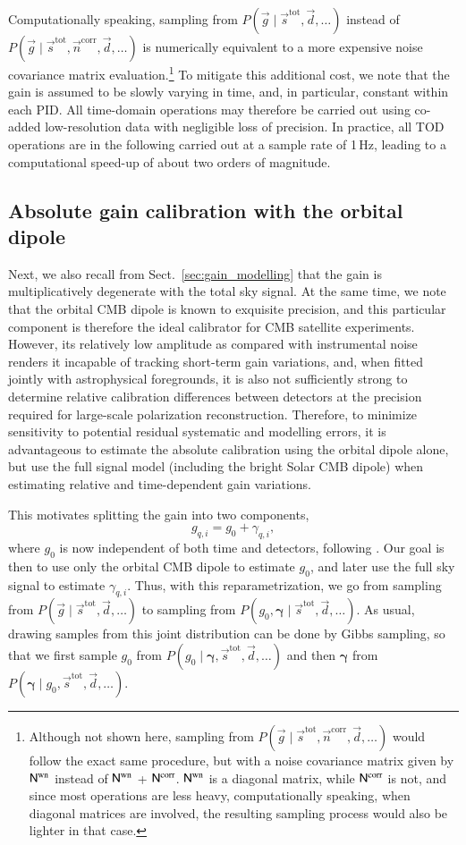 \documentclass[twocolumn]{aa}
\renewcommand{\d}[0]{\vec{d}}
\newcommand{\n}[0]{\vec{n}}
\newcommand{\s}[0]{\vec{s}}
\newcommand{\g}[0]{\vec{g}}
\newcommand{\bgamma}[0]{\boldsymbol{\gamma}}
\newcommand{\N}[0]{\tens{N}}
\newcommand{\qi}[0]{_{q, i}}
\newcommand{\tot}[0]{^{\mathrm{tot}}}
\newcommand{\corr}[0]{^{\mathrm{corr}}}
\newcommand{\wn}[0]{^{\mathrm{wn}}}
\begin{document}
Computationally speaking, sampling from $P(\g\mid\s\tot, \d, \ldots)$ instead of $P(\g\mid\s\tot, \n\corr, \d, \ldots)$ is numerically equivalent to a
more expensive noise covariance matrix evaluation.\footnote{Although not shown here, sampling from $P(\g\mid\s\tot, \n\corr, \d, \ldots)$ would follow the exact same procedure, but with a noise covariance matrix given by $\N\wn$ instead of $\N\wn$ + $\N\corr$. $\N\wn$ is a diagonal matrix, while $\N\corr$ is not, and since most operations are less heavy, computationally speaking, when diagonal matrices are involved, the resulting sampling process would also be lighter in that case.} To mitigate this
additional cost, we note that the gain is assumed to be slowly varying
in time, and, in particular, constant within each PID. All time-domain
operations may therefore be carried out using co-added low-resolution
data with negligible loss of precision. In practice, all TOD
operations are in the following carried out at a sample rate of 1\,Hz,
leading to a computational speed-up of about two orders of
magnitude.

\subsection{Absolute gain calibration with the orbital dipole}
Next, we also recall from Sect.~\ref{sec:gain_modelling} that the gain
is multiplicatively degenerate with the total sky signal. At the same
time, we note that the orbital CMB dipole is known to exquisite
precision, and this particular component is therefore the ideal
calibrator for CMB satellite experiments. However, its relatively low
amplitude as compared with instrumental noise renders it incapable of
tracking short-term gain variations, and, when fitted jointly with
astrophysical foregrounds, it is also not sufficiently strong to
determine relative calibration differences between detectors at the
precision required for large-scale polarization
reconstruction. Therefore, to minimize sensitivity to potential
residual systematic and modelling errors, it is advantageous to
estimate the absolute calibration using the orbital dipole alone, but
use the full signal model (including the bright Solar CMB dipole) when
estimating relative and time-dependent gain variations.

This motivates splitting the gain into two components, 
\begin{equation}
  g\qi = g_0 + \gamma\qi,
  \label{eq:split1}
\end{equation}
where $g_0$ is now independent of both time and detectors, following
\citet{planck2020-LVII}. Our goal is then to use only the orbital CMB
dipole to estimate $g_0$, and later use the full sky signal to
estimate $\gamma\qi$. Thus, with this reparametrization, we go from
sampling from $P(\g\mid\s\tot, \d, \ldots)$ to sampling from $P(g_0,
\bgamma\mid\s\tot, \d, \ldots)$. As usual, drawing samples from this
joint distribution can be done by Gibbs sampling, so that we first
sample $g_0$ from $P(g_0 \mid \bgamma, \s\tot, \d, \ldots)$ and then
$\bgamma$ from $P(\bgamma\mid g_0, \s\tot, \d, \ldots)$.
\end{document}
